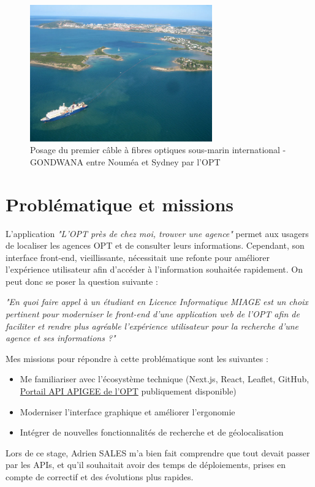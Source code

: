 \documentclass[12pt,a4paper]{report}
\begin{document}
\vspace{1cm}

\begin{figure}[h] %
    \centering
    \includegraphics[width=0.7\textwidth]{ressources_rapport/pose-cable-gondwana.jpg}
    \caption{Posage du premier câble à fibres optiques sous-marin international - GONDWANA entre Nouméa et Sydney par l'OPT}
\end{figure}
\newpage

\section{Problématique et missions}
L’application \textit{"L'OPT près de chez moi, trouver une agence"} permet aux usagers de localiser les agences OPT et de consulter leurs informations. Cependant, son interface front-end, vieillissante, nécessitait une refonte pour améliorer l’expérience utilisateur afin d'accéder à l'information souhaitée rapidement. On peut donc se poser la question suivante :

\vspace{1cm}

\textit{"En quoi faire appel à un étudiant en Licence Informatique MIAGE est un choix pertinent pour moderniser le front-end d'une application web de l'OPT afin de faciliter et rendre plus agréable l'expérience utilisateur pour la recherche d'une agence et ses informations ?"}

\vspace{1cm}
Mes missions pour répondre à cette problématique sont les suivantes :  
\begin{itemize}
    \item Me familiariser avec l’écosystème technique (Next.js, React, Leaflet, GitHub, \href{https://apigee-optnc-prd-api.apigee.io}{Portail API APIGEE de l'OPT} publiquement disponible)
    \item Moderniser l’interface graphique et améliorer l’ergonomie
    \item Intégrer de nouvelles fonctionnalités de recherche et de géolocalisation
\end{itemize}
\vspace{1cm}
Lors de ce stage, Adrien SALES m'a bien fait comprendre que tout devait passer par les APIs, et qu'il souhaitait avoir des temps de déploiements, prises en compte de correctif et des évolutions plus rapides.
\newpage
\end{document}
